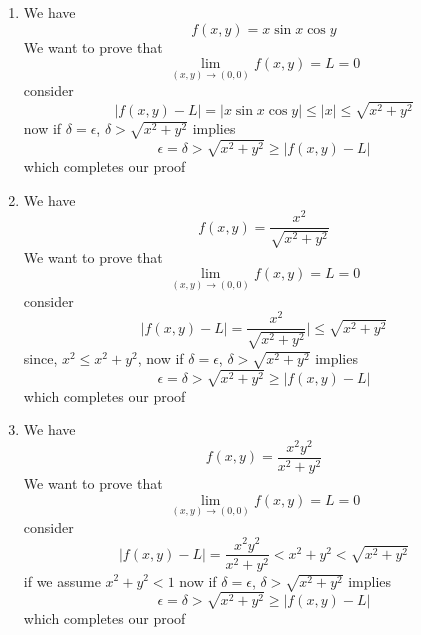 \documentclass[12pt]{article}
\begin{document}
\begin{enumerate}
\begin{enumerate}
			\item
				We have
				$$
				f(x,y) = x \sin x \cos y
				$$
				We want to prove that
				$$
				\lim_{ (x,y) \to (0,0) } f(x,y) = L = 0 
				$$
				consider
				$$
				|f(x,y)-L| = |x\sin x\cos y|\leq |x|\leq \sqrt{ x^{2} + y^{2} }
				$$
				now if $\delta = \epsilon$, $\delta > \sqrt{ x^{2} + y^{2} }$ implies
				$$
				\epsilon = \delta > \sqrt{ x^{2} + y^{2} } \geq |f(x,y)-L|
				$$
				which completes our proof

			\item
				We have
				$$
				f(x,y) = \frac{x^{2}}{\sqrt{ x^{2} + y^{2} }}
				$$
				We want to prove that
				$$
				\lim_{ (x,y) \to (0,0) } f(x,y) = L = 0 
				$$
				consider
				$$
				|f(x,y)-L| =\frac{x^{2}}{\sqrt{ x^{2} + y^{2} }}|\leq \sqrt{ x^{2} + y^{2} }
				$$
				since, $x^{2} \leq x^{2} + y^{2}$, now if $\delta = \epsilon$, $\delta > \sqrt{ x^{2} + y^{2} }$ implies
				$$
				\epsilon = \delta > \sqrt{ x^{2} + y^{2} } \geq |f(x,y)-L|
				$$
				which completes our proof
			\item
				We have
				$$
				f(x,y) = \frac{x^{2}y^{2}}{x^{2} + y^{2}} 
				$$
				We want to prove that
				$$
				\lim_{ (x,y) \to (0,0) } f(x,y) = L = 0 
				$$
				consider
				$$
				|f(x,y)-L| = \frac{x^{2}y^{2}}{x^{2} + y^{2}} < x^{2} + y^{2} < \sqrt{ x^{2} + y^{2} }
				$$
				if we assume $x^{2} + y^{2} < 1$ now if $\delta = \epsilon$, $\delta > \sqrt{ x^{2} + y^{2} }$ implies
				$$
				\epsilon = \delta > \sqrt{ x^{2} + y^{2} } \geq |f(x,y)-L| 
				$$
				which completes our proof
		\end{enumerate}
\end{enumerate}
\end{document}
